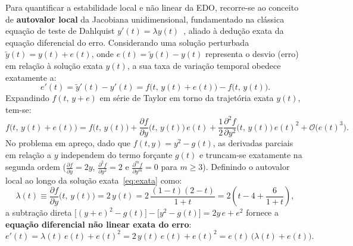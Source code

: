 \documentclass[12pt, a4paper]{article}
\begin{document}
Para quantificar a estabilidade local e não linear da EDO, recorre-se ao conceito de
\textbf{autovalor local} da Jacobiana unidimensional, fundamentado na clássica
equação de teste de Dahlquist $y'(t) = \lambda y(t)$~\cite{lambert1991,leveque2007},
aliado à dedução exata da equação diferencial do erro.
Considerando uma solução perturbada $\tilde{y}(t) = y(t) + e(t)$, onde
$e(t) = \tilde{y}(t) - y(t)$ representa o desvio (erro) em relação à solução exata
$y(t)$, a sua taxa de variação temporal obedece exatamente a:
\begin{equation}
  e'(t) = \tilde{y}'(t) - y'(t) = f\bigl(t,\, y(t) + e(t)\bigr) - f\bigl(t,\, y(t)\bigr).
\end{equation}
Expandindo $f(t,\, y + e)$ em série de Taylor em torno da trajetória exata $y(t)$, tem-se:
\begin{equation}
  f\bigl(t,\, y(t) + e(t)\bigr) = f\bigl(t,\, y(t)\bigr) + \frac{\partial f}{\partial y}\bigl(t,\, y(t)\bigr)\,e(t) + \frac{1}{2}\frac{\partial^2 f}{\partial y^2}\bigl(t,\, y(t)\bigr)\,e(t)^2 + \mathcal{O}\bigl(e(t)^3\bigr).
\end{equation}
No problema em apreço, dado que $f(t,y) = y^2 - g(t)$, as derivadas parciais em relação a $y$ independem do termo forçante $g(t)$ e truncam-se exatamente na segunda ordem ($\frac{\partial f}{\partial y} = 2y$, $\frac{\partial^2 f}{\partial y^2} = 2$ e $\frac{\partial^m f}{\partial y^m} = 0$ para $m \ge 3$). Definindo o autovalor local ao longo da solução exata~\eqref{eq:exata} como:
\begin{equation}\label{eq:autovalor-exato}
  \lambda(t) \equiv \frac{\partial f}{\partial y}\bigl(t,\, y(t)\bigr) = 2\,y(t) = 2\,\frac{(1-t)(2-t)}{1+t} = 2\left(t - 4 + \frac{6}{1+t}\right),
\end{equation}
a subtração direta $\bigl[(y + e)^2 - g(t)\bigr] - \bigl[y^2 - g(t)\bigr] = 2y\,e + e^2$ fornece a \textbf{equação diferencial não linear exata do erro}:
\begin{equation}\label{eq:erro-exata-bernoulli}
  e'(t) = \lambda(t)\,e(t) + e(t)^2 = 2\,y(t)\,e(t) + e(t)^2 = e(t)\,\bigl(\lambda(t) + e(t)\bigr).
\end{equation}
\end{document}
